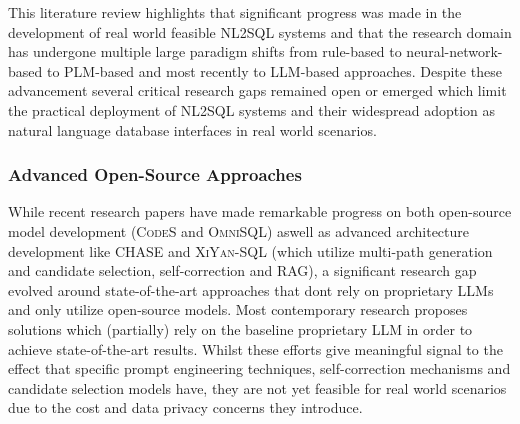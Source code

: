This literature review highlights that significant progress was made in the development of real world feasible NL2SQL systems
and that the research domain has undergone multiple large paradigm shifts from rule-based to neural-network-based to PLM-based
and most recently to LLM-based approaches. Despite these advancement several critical research gaps remained open or emerged
which limit the practical deployment of NL2SQL systems and their widespread adoption as natural language database interfaces
in real world scenarios.

\subsubsection{Advanced Open-Source Approaches}

While recent research papers have made remarkable progress on both open-source model development (\textsc{CodeS} and
\textsc{OmniSQL}) aswell as advanced architecture development like CHASE and \textsc{XiYan-SQL} (which utilize multi-path
generation and candidate selection, self-correction and RAG), a significant research gap evolved around state-of-the-art
approaches that dont rely on proprietary LLMs and only utilize open-source models. Most contemporary research proposes
solutions which (partially) rely on the baseline proprietary LLM in order to achieve state-of-the-art results. Whilst
these efforts give meaningful signal to the effect that specific prompt engineering techniques, self-correction mechanisms
and candidate selection models have, they are not yet feasible for real world scenarios due to the cost and data privacy
concerns they introduce.

